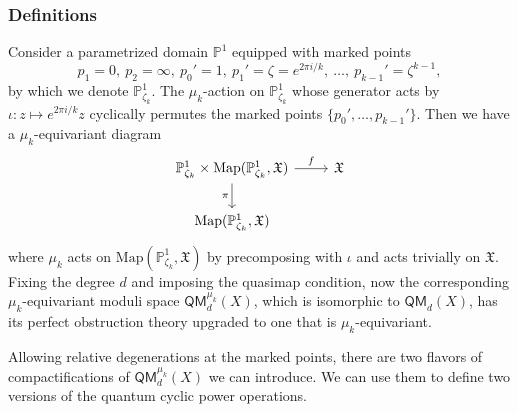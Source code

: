 \documentclass[reqno]{amsart}
\numberwithin{equation}{section}
\numberwithin{equation}{section}
\numberwithin{equation}{section}
\theoremstyle{definition}
\theoremstyle{remark}
\theoremstyle{remark}
\begin{document}
\subsubsection{Definitions}
Consider a parametrized domain $\mathbb{P}^1$ equipped with marked points
\begin{equation}
    p_1 = 0, \ p_2 =\infty, \ p_0' = 1, \  p_1' =  \zeta = e^{2\pi i /k}, \ \dots, \ p_{k-1}' =  \zeta^{k-1},
\end{equation}
by which we denote $\mathbb{P}^1_{\zeta_k}$. The $\mu_k$-action on $\mathbb{P}^1_{\zeta_k}$ whose generator acts by $\iota: z \mapsto e^{2\pi i /k} z$ cyclically permutes the marked points $\{ p_0', \dots, p_{k-1}'\}$. Then we have a $\mu_k$-equivariant diagram
\begin{equation}
    \begin{tikzcd}
{\mathbb{P}^1_{\zeta_k} \times \mathrm{Map}(\mathbb{P}^1_{\zeta_k}, \mathfrak{X})} \arrow[d, "\pi"'] \arrow[r, "f"] & \mathfrak{X} \\
{\mathrm{Map}(\mathbb{P}^1_{\zeta_k}, \mathfrak{X})}                                                      &             
\end{tikzcd}
\end{equation}
where $\mu_k$ acts on $\mathrm{Map}(\mathbb{P}^1_{\zeta_k}, \mathfrak{X})$ by precomposing with $\iota$ and acts trivially on $\mathfrak{X}$. Fixing the degree $d$ and imposing the quasimap condition, now the corresponding $\mu_k$-equivariant moduli space $\mathsf{QM}_d^{\mu_k}(X)$, which is isomorphic to $\mathsf{QM}_d(X)$, has its perfect obstruction theory upgraded to one that is $\mu_k$-equivariant.

Allowing relative degenerations at the marked points, there are two flavors of compactifications of $\mathsf{QM}_d^{\mu_k}(X)$ we can introduce. We can use them to define two versions of the quantum cyclic power operations.
\end{document}
